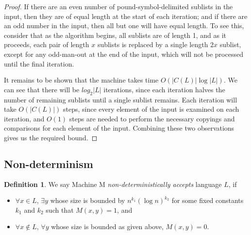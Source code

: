 \documentclass[english]{article}
\theoremstyle{plain}
\theoremstyle{definition}
\newtheorem{defn}[thm]{Definition}
\theoremstyle{plain}
\begin{document}
\begin{proof}
  If there are an even number of pound-symbol-delimited sublists in
  the input, then they are of equal length at the start of each
  iteration; and if there are an odd number in the input, then all but
  one will have equal length. To see this, consider that as the
  algorithm begins, all sublists are of length 1, and as it proceeds,
  each pair of length $x$ sublists is replaced by a single length $2x$
  sublist, except for any odd-man-out at the end of the input, which
  will not be processed until the final iteration.

  It remains to be shown that the machine takes time
  $O(|C(L)|\log|L|)$. We can see that there will be $log_2|L|$
  iterations, since each iteration halves the number of remaining
  sublists until a single sublist remains. Each iteration will take
  $O(|C(L)|)$ steps, since every element of the input is examined on
  each iteration, and $O(1)$ steps are needed to perform the necessary
  copyings and comparisons for each element of the input. Combining
  these two observations gives us the required bound.
\end{proof}


\subsection{Non-determinism}

\begin{defn}
  We say Machine M \emph{non-deterministically accepts} language $L$,
  if
  \begin{itemize}
    \item $\forall x \in L$, $\exists y$ whose size is bounded by
      $n^{k_1} (\log n)^{k_2}$ for some fixed constants $k_1$ and
      $k_2$ such that $M(x,y) = 1$, and
    \item $\forall x \notin L$, $\forall y$ whose size is bounded as
      given above, $M(x,y) = 0$.
  \end{itemize}
\end{defn}
\end{document}
